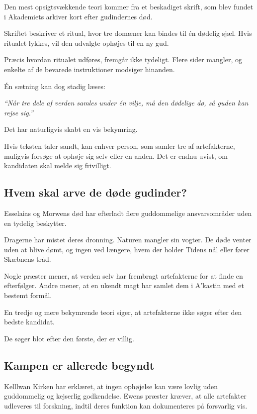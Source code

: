 \documentclass[a4paper,12pt]{memoir}
\newenvironment{pullquote}
  {\begin{tcolorbox}[enhanced, breakable]\itshape\large}
  {\end{tcolorbox}}
\begin{document}
Den mest opsigtsvækkende teori kommer fra et beskadiget skrift, som blev fundet i Akademiets arkiver kort efter gudindernes død.

Skriftet beskriver et ritual, hvor tre domæner kan bindes til én dødelig sjæl. Hvis ritualet lykkes, vil den udvalgte ophøjes til en ny gud.

Præcis hvordan ritualet udføres, fremgår ikke tydeligt. Flere sider mangler, og enkelte af de bevarede instruktioner modsiger hinanden.

Én sætning kan dog stadig læses:

\begin{pullquote}
``Når tre dele af verden samles under én vilje, må den dødelige dø, så guden kan rejse sig.''
\end{pullquote}

Det har naturligvis skabt en vis bekymring.

Hvis teksten taler sandt, kan enhver person, som samler tre af artefakterne, muligvis forsøge at ophøje sig selv eller en anden. Det er endnu uvist, om kandidaten skal melde sig frivilligt.

\subsection*{Hvem skal arve de døde gudinder?}

Esselaias og Morwens død har efterladt flere guddommelige ansvarsområder uden en tydelig beskytter.

Dragerne har mistet deres dronning. Naturen mangler sin vogter. De døde venter uden at blive dømt, og ingen ved længere, hvem der holder Tidens nål eller fører Skæbnens tråd.

Nogle præster mener, at verden selv har frembragt artefakterne for at finde en efterfølger. Andre mener, at en ukendt magt har samlet dem i A'kastin med et bestemt formål.

En tredje og mere bekymrende teori siger, at artefakterne ikke søger efter den bedste kandidat.

De søger blot efter den første, der er villig.

\subsection*{Kampen er allerede begyndt}

Kelllwan Kirken har erklæret, at ingen ophøjelse kan være lovlig uden guddommelig og kejserlig godkendelse. Ewens præster kræver, at alle artefakter udleveres til forskning, indtil deres funktion kan dokumenteres på forsvarlig vis.
\end{document}
